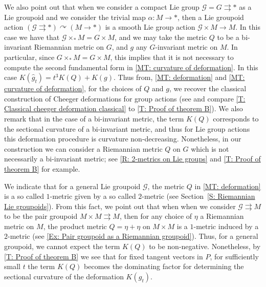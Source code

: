 \documentclass[12pt,a4paper,reqno]{amsart}
\newcommand{\1}{\mathbbm{1}} %
\newcommand{\G}{\mathcal{G}} %
\theoremstyle{definition}
\theoremstyle{TheoremNum}
\begin{document}
We also point out that when we consider a compact Lie group $\G = G\rightrightarrows \ast$ as a Lie groupoid and we consider the trivial map $\alpha\colon M\to \ast$, then a Lie groupoid action $(\G\rightrightarrows \ast) \curvearrowright (M\to \ast)$ is a smooth Lie group action $\G\times M\to M$. In this case we  have that $\G\times_{\ast} M = G\times M$, and we may take the metric $Q$ to be a bi-invariant Riemannian metric on $G$, and $g$ any $G$-invariant metric on $M$. In particular, since $G\times_\ast M = G\times M$, this implies that it is not necessary to compute the second fundamental form in \th\ref{MT: curvature of deformation}. In this case $K(\widehat{g}_t) = t^3K(Q)+K(g)$. Thus from, \th\ref{MT: deformation} and \th\ref{MT: curvature of deformation}, for the choices of $Q$ and $g$, we recover the classical construction of Cheeger deformations for group actions (see \cite{Mueter} and compare \th\ref{T: Classical cheeger deformation classical} to \th\ref{T: Proof of theorem B}). We also remark  that in the case  of a bi-invariant metric, the term $K(Q)$ corresponds to the sectional curvature of a bi-invariant metric, and thus for Lie group actions this deformation procedure is curvature non-decreasing. Nonetheless, in our construction we can consider a Riemannian metric $Q$ on $G$ which is not necessarily a bi-invariant metric; see \th\ref{R: 2-metrics on Lie groups} and \th\ref{T: Proof of theorem B} for example. 

We indicate that for a general Lie groupoid $\G$, the metric $Q$ in \th\ref{MT: deformation} is a so called $1$-metric given by a so called $2$-metric (see Section~\ref{S: Riemannian Lie groupoids}). From this fact, we point out that when when we consider $\G\rightrightarrows M$  to be the pair groupoid $M\times M\rightrightarrows M$, then for any choice of $\eta$ a Riemannian metric on $M$, the product metric $Q=\eta+\eta$ on $M\times M$ is a $1$-metric induced by a $2$-metric (see \th\ref{Ex: Pair groupoid as a Riemannian groupoid}). Thus, for a general groupoid, we cannot expect the term $K(Q)$ to be non-negative. Nonetheless, by \th\ref{T: Proof of theorem B} we see that for fixed tangent vectors in $P$, for sufficiently small $t$ the term $K(Q)$ becomes the dominating factor for determining the sectional curvature of the deformation $K(g_t)$.
\end{document}
